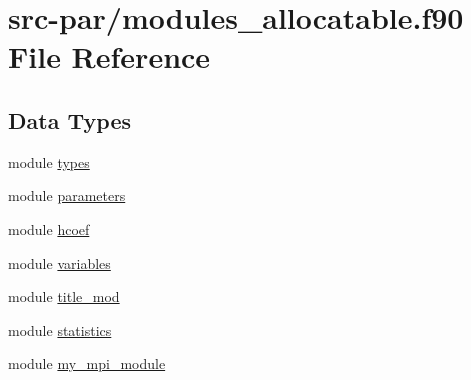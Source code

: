 \hypertarget{modules__allocatable_8f90}{\section{src-\/par/modules\-\_\-allocatable.f90 File Reference}
\label{modules__allocatable_8f90}
}
\subsection*{Data Types}
\begin{DoxyCompactItemize}
\item 
module \hyperlink{classtypes}{types}
\item 
module \hyperlink{classparameters}{parameters}
\item 
module \hyperlink{classhcoef}{hcoef}
\item 
module \hyperlink{classvariables}{variables}
\item 
module \hyperlink{classtitle__mod}{title\-\_\-mod}
\item 
module \hyperlink{classstatistics}{statistics}
\item 
module \hyperlink{classmy__mpi__module}{my\-\_\-mpi\-\_\-module}
\end{DoxyCompactItemize}
